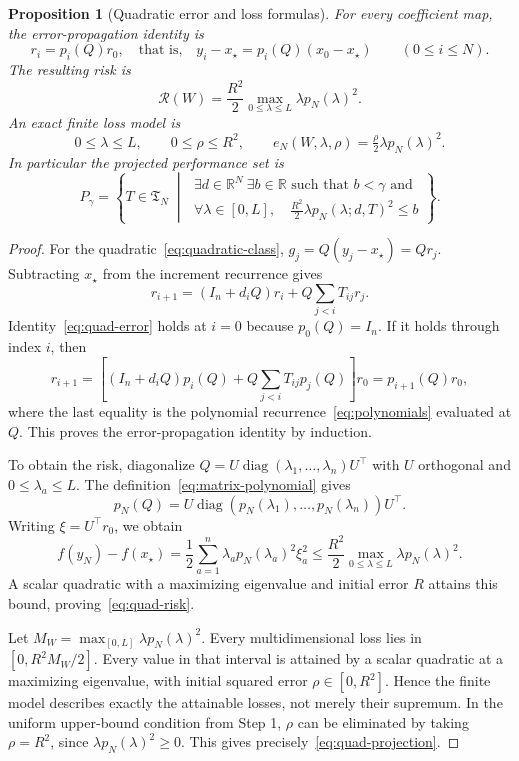 \documentclass[11pt]{article}
\numberwithin{equation}{section}
\newtheorem{proposition}[theorem]{Proposition}
\theoremstyle{definition}
\newcommand{\R}{\mathbb R}
\newcommand{\risk}{\mathcal R}
\begin{document}
\begin{proposition}[Quadratic error and loss formulas]\label{prop:quadratic-risk}
For every coefficient map, the error-propagation identity is
\begin{equation}
 r_i=p_i(Q)r_0,
 \quad\text{that is,}\quad
 y_i-x_\star=p_i(Q)(x_0-x_\star)
 \qquad(0\le i\le N).
 \label{eq:quad-error}
\end{equation}
The resulting risk is
\begin{equation}
 \risk(W)=\frac{R^2}{2}\max_{0\le\lambda\le L}\lambda p_N(\lambda)^2.
 \label{eq:quad-risk}
\end{equation}
An exact finite loss model is
\[
 0\le\lambda\le L,\qquad 0\le\rho\le R^2,\qquad
 e_N(W,\lambda,\rho)=\tfrac{\rho}{2}\lambda p_N(\lambda)^2.
\]
In particular the projected performance set is
\begin{equation}
 P_\gamma=\left\{T\in\mathfrak T_N\;\middle|\;
 \begin{array}{l}
 \exists d\in\R^N\ \exists b\in\R\text{ such that }b<\gamma\text{ and}\\[2pt]
 \forall\lambda\in[0,L],\quad
       \tfrac{R^2}{2}\lambda p_N(\lambda;d,T)^2\le b
 \end{array}
 \right\}.
 \label{eq:quad-projection}
\end{equation}
\end{proposition}
\begin{proof}
For the quadratic~\eqref{eq:quadratic-class}, $g_j=Q(y_j-x_\star)=Qr_j$. Subtracting $x_\star$ from the increment recurrence gives
\[
 r_{i+1}=(I_n+d_iQ)r_i+Q\sum_{j<i}T_{ij}r_j.
\]
Identity~\eqref{eq:quad-error} holds at $i=0$ because $p_0(Q)=I_n$. If it holds through index $i$, then
\[
 r_{i+1}
 =\left[(I_n+d_iQ)p_i(Q)+Q\sum_{j<i}T_{ij}p_j(Q)\right]r_0
 =p_{i+1}(Q)r_0,
\]
where the last equality is the polynomial recurrence~\eqref{eq:polynomials} evaluated at $Q$. This proves the error-propagation identity by induction.

To obtain the risk, diagonalize $Q=U\operatorname{diag}(\lambda_1,\ldots,\lambda_n)U^\top$ with $U$ orthogonal and $0\le\lambda_a\le L$. The definition~\eqref{eq:matrix-polynomial} gives
\[
 p_N(Q)=U\operatorname{diag}(p_N(\lambda_1),\ldots,p_N(\lambda_n))U^\top.
\]
Writing $\xi=U^\top r_0$, we obtain
\[
 f(y_N)-f(x_\star)
 =\frac12\sum_{a=1}^n\lambda_a p_N(\lambda_a)^2\xi_a^2
 \le\frac{R^2}{2}\max_{0\le\lambda\le L}\lambda p_N(\lambda)^2.
\]
A scalar quadratic with a maximizing eigenvalue and initial error $R$ attains this bound, proving~\eqref{eq:quad-risk}.

Let $M_W=\max_{[0,L]}\lambda p_N(\lambda)^2$. Every multidimensional loss lies in $[0,R^2M_W/2]$. Every value in that interval is attained by a scalar quadratic at a maximizing eigenvalue, with initial squared error $\rho\in[0,R^2]$. Hence the finite model describes exactly the attainable losses, not merely their supremum. In the uniform upper-bound condition from Step 1, $\rho$ can be eliminated by taking $\rho=R^2$, since $\lambda p_N(\lambda)^2\ge0$. This gives precisely~\eqref{eq:quad-projection}.
\end{proof}
\end{document}
